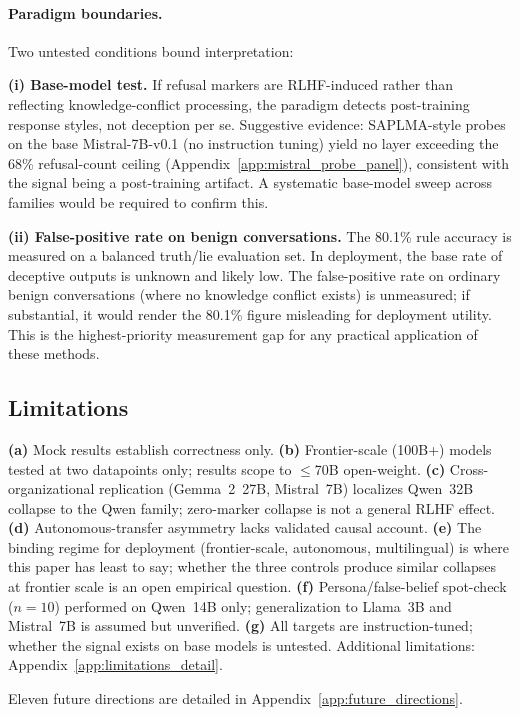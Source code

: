 \paragraph{Paradigm boundaries.} Two untested conditions bound interpretation:

\textbf{(i) Base-model test.} If refusal markers are RLHF-induced rather than reflecting knowledge-conflict processing, the paradigm detects post-training response styles, not deception per se. Suggestive evidence: SAPLMA-style probes on the base Mistral-7B-v0.1 (no instruction tuning) yield no layer exceeding the 68\% refusal-count ceiling (Appendix~\ref{app:mistral_probe_panel}), consistent with the signal being a post-training artifact. A systematic base-model sweep across families would be required to confirm this.

\textbf{(ii) False-positive rate on benign conversations.} The 80.1\% rule accuracy is measured on a balanced truth/lie evaluation set. In deployment, the base rate of deceptive outputs is unknown and likely low. The false-positive rate on ordinary benign conversations (where no knowledge conflict exists) is unmeasured; if substantial, it would render the 80.1\% figure misleading for deployment utility. This is the highest-priority measurement gap for any practical application of these methods.

\subsection{Limitations}
\label{sec:limitations}

\textbf{(a)} Mock results establish correctness only. \textbf{(b)} Frontier-scale (100B+) models tested at two datapoints only; results scope to $\leq$70B open-weight. \textbf{(c)} Cross-organizational replication (Gemma~2~27B, Mistral~7B) localizes Qwen~32B collapse to the Qwen family; zero-marker collapse is not a general RLHF effect. \textbf{(d)} Autonomous-transfer asymmetry lacks validated causal account. \textbf{(e)} The binding regime for deployment (frontier-scale, autonomous, multilingual) is where this paper has least to say; whether the three controls produce similar collapses at frontier scale is an open empirical question. \textbf{(f)} Persona/false-belief spot-check ($n\!=\!10$) performed on Qwen~14B only; generalization to Llama~3B and Mistral~7B is assumed but unverified. \textbf{(g)} All targets are instruction-tuned; whether the signal exists on base models is untested. Additional limitations: Appendix~\ref{app:limitations_detail}.

\label{sec:interrogation_role}
\label{sec:deployment}

Eleven future directions are detailed in Appendix~\ref{app:future_directions}.
